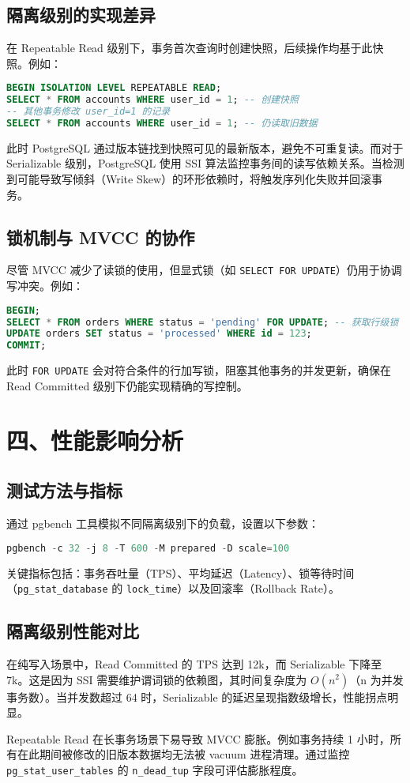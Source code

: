 \section{隔离级别的实现差异}
在 Repeatable Read 级别下，事务首次查询时创建快照，后续操作均基于此快照。例如：\par
\begin{lstlisting}[language=sql]
BEGIN ISOLATION LEVEL REPEATABLE READ;
SELECT * FROM accounts WHERE user_id = 1; -- 创建快照
-- 其他事务修改 user_id=1 的记录
SELECT * FROM accounts WHERE user_id = 1; -- 仍读取旧数据
\end{lstlisting}
此时 PostgreSQL 通过版本链找到快照可见的最新版本，避免不可重复读。而对于 Serializable 级别，PostgreSQL 使用 SSI 算法监控事务间的读写依赖关系。当检测到可能导致写倾斜（Write Skew）的环形依赖时，将触发序列化失败并回滚事务。\par
\section{锁机制与 MVCC 的协作}
尽管 MVCC 减少了读锁的使用，但显式锁（如 \verb!SELECT FOR UPDATE!）仍用于协调写冲突。例如：\par
\begin{lstlisting}[language=sql]
BEGIN;
SELECT * FROM orders WHERE status = 'pending' FOR UPDATE; -- 获取行级锁
UPDATE orders SET status = 'processed' WHERE id = 123;
COMMIT;
\end{lstlisting}
此时 \verb!FOR UPDATE! 会对符合条件的行加写锁，阻塞其他事务的并发更新，确保在 Read Committed 级别下仍能实现精确的写控制。\par
\chapter{四、性能影响分析}
\section{测试方法与指标}
通过 pgbench 工具模拟不同隔离级别下的负载，设置以下参数：\par
\begin{lstlisting}[language=sql]
pgbench -c 32 -j 8 -T 600 -M prepared -D scale=100
\end{lstlisting}
关键指标包括：事务吞吐量（TPS）、平均延迟（Latency）、锁等待时间（\verb!pg_stat_database! 的 \verb!lock_time!）以及回滚率（Rollback Rate）。\par
\section{隔离级别性能对比}
在纯写入场景中，Read Committed 的 TPS 达到 12k，而 Serializable 下降至 7k。这是因为 SSI 需要维护谓词锁的依赖图，其时间复杂度为 $O(n^2)$（n 为并发事务数）。当并发数超过 64 时，Serializable 的延迟呈现指数级增长，性能拐点明显。\par
Repeatable Read 在长事务场景下易导致 MVCC 膨胀。例如事务持续 1 小时，所有在此期间被修改的旧版本数据均无法被 vacuum 进程清理。通过监控 \verb!pg_stat_user_tables! 的 \verb!n_dead_tup! 字段可评估膨胀程度。\par
